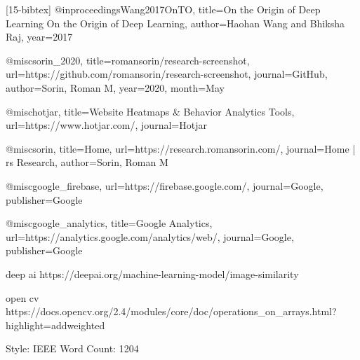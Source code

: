 [15-bibtex]
@inproceedings{Wang2017OnTO,
  title={On the Origin of Deep Learning On the Origin of Deep Learning},
  author={Haohan Wang and Bhiksha Raj},
  year={2017}
}

@misc{sorin_2020, title={romansorin/research-screenshot}, url={https://github.com/romansorin/research-screenshot}, journal={GitHub}, author={Sorin, Roman M}, year={2020}, month={May}}

@misc{hotjar, title={Website Heatmaps & Behavior Analytics Tools}, url={https://www.hotjar.com/}, journal={Hotjar}}

@misc{sorin, title={Home}, url={https://research.romansorin.com/}, journal={Home | rs Research}, author={Sorin, Roman M}}

@misc{google_firebase, url={https://firebase.google.com/}, journal={Google}, publisher={Google}}

@misc{google_analytics, title={Google Analytics}, url={https://analytics.google.com/analytics/web/}, journal={Google}, publisher={Google}}

deep ai https://deepai.org/machine-learning-model/image-similarity

open cv https://docs.opencv.org/2.4/modules/core/doc/operations_on_arrays.html?highlight=addweighted

Style: IEEE
Word Count: 1204